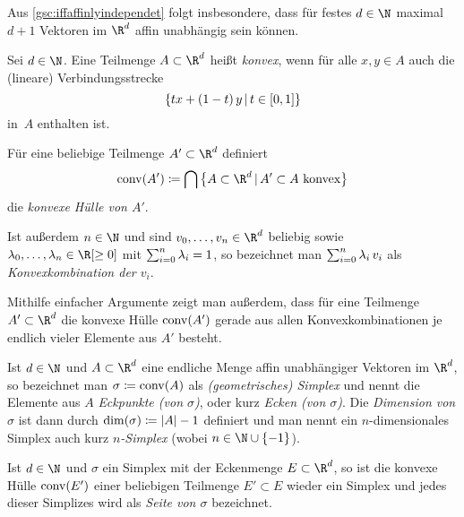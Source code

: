 
Aus \cref{gsc:iffaffinlyindependet} folgt insbesondere, dass für festes $d\in\N$
maximal $d+1$ Vektoren im $\R^d$ affin unabhängig sein können.

\begin{thDef}
    Sei $d\in\N$. Eine Teilmenge $A\subset\R^d$ heißt \emph{konvex}, wenn
    für alle $x,y\in A$ auch die (lineare) Verbindungsstrecke
    \[ \{ tx + (1-t)\,y \Mid t\in[0,1] \} \]
    in~$A$ enthalten ist.

    \newpage
    \noindent
    Für eine beliebige Teilmenge $A'\subset\R^d$ definiert
    \[ \conv(A') \defeq 
        \bigcap \,\bigl\{ A\subset\R^d \Mid A'\subset A\text{ konvex} \bigr\}
    \]
    die \emph{konvexe Hülle von $A'$}.
    
    \noindent
    Ist außerdem $n\in\N$ und sind $v_0,\ldots,v_n\in\R^d$ beliebig sowie
    $\lambda_0,\ldots,\lambda_n\in\R[\geq0]$ mit $\sum_{i=0}^n\lambda_i = 1$, so
    bezeichnet man $\sum_{i=0}^n \lambda_i\,v_i$ als \emph{Konvexkombination der
    $v_i$}.
\end{thDef}

\begin{thBemerkung} \label{gsc:convexhullviaconvexcombinations}
    Mithilfe einfacher Argumente zeigt man außerdem, dass für eine Teilmenge
    $A'\subset\R^d$ die konvexe Hülle $\operatorname{conv}(A')$ gerade aus allen 
    Konvexkombinationen je endlich vieler Elemente aus $A'$ besteht.
\end{thBemerkung}


\begin{thDef}
    \label{gsc:def:simplex}
    Ist $d\in\N$ und $A\subset\R^d$ eine endliche Menge affin unabhängiger
    Vektoren im $\R^d$, so bezeichnet man $\sigma \coloneqq \operatorname{conv}(A)$ als
    \emph{(geometrisches) Simplex} und nennt die Elemente aus $A$
    \emph{Eckpunkte (von $\sigma$)}, oder kurz \emph{Ecken (von $\sigma$)}. Die
    \emph{Dimension von $\sigma$} ist dann durch $\dim(\sigma) \coloneqq \lvert A\rvert-1$
    definiert und man nennt ein $n$-dimensionales Simplex auch kurz
    \emph{$n$-Simplex} (wobei $n\in\N\cup\{-1\}$).
\end{thDef}

\begin{thDef}
    Ist $d\in\N$ und $\sigma$ ein Simplex mit der Eckenmenge
    $E \subset\R^d$, so ist die konvexe Hülle $\operatorname{conv}(E')$ einer beliebigen 
    Teilmenge $E'\subset E$ wieder ein Simplex und jedes dieser Simplizes wird
    als \emph{Seite von $\sigma$} bezeichnet.
\end{thDef}

